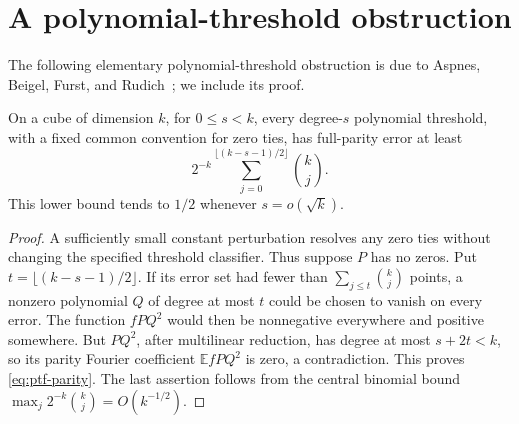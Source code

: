 \section{A polynomial-threshold obstruction}
The following elementary polynomial-threshold obstruction is due to
Aspnes, Beigel, Furst, and Rudich~\cite{ABFR}; we include its proof.
\begin{lemma}
\label{lem:ptf-parity}
On a cube of dimension $k$, for $0\le s<k$, every degree-$s$ polynomial threshold, with a fixed common convention
for zero ties, has full-parity error at least
\begin{equation}\label{eq:ptf-parity}
 2^{-k}\sum_{j=0}^{\lfloor(k-s-1)/2\rfloor}\binom kj.
\end{equation}
This lower bound tends to $1/2$ whenever $s=o(\sqrt k)$.
\end{lemma}
\begin{proof}
A sufficiently small constant perturbation resolves any zero ties
without changing the specified threshold classifier. Thus suppose
$P$ has no zeros. Put $t=\lfloor(k-s-1)/2\rfloor$. If its error set
had fewer than $\sum_{j\le t}\binom kj$ points, a nonzero polynomial
$Q$ of degree at most $t$ could be chosen to vanish on every error.
The function $fPQ^2$ would then be nonnegative everywhere and positive
somewhere. But $PQ^2$, after multilinear reduction, has degree at most
$s+2t<k$, so its parity Fourier coefficient
$\mathbb E fPQ^2$ is zero, a contradiction. This proves
\eqref{eq:ptf-parity}. The last assertion follows from the central
binomial bound $\max_j2^{-k}\binom kj=O(k^{-1/2})$.
\end{proof}

